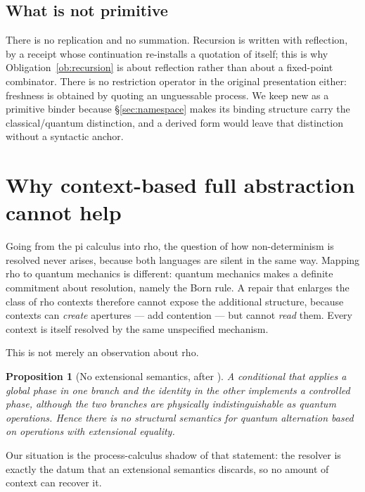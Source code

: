 \documentclass[11pt,a4paper]{article}
\theoremstyle{plain}
\newtheorem{proposition}[theorem]{Proposition}
\theoremstyle{definition}
\theoremstyle{remark}
\begin{document}
\subsection{What is not primitive}

There is no replication and no summation. Recursion is written with reflection,
by a receipt whose continuation re-installs a quotation of itself; this is why
Obligation~\ref{ob:recursion} is about reflection rather than about a fixed-point
combinator. There is no restriction operator in the original presentation
either: freshness is obtained by quoting an unguessable process. We keep
\textsf{new} as a primitive binder because \S\ref{sec:namespace} makes its
binding structure carry the classical/quantum distinction, and a derived form
would leave that distinction without a syntactic anchor.

\section{Why context-based full abstraction cannot help}\label{sec:fa}

Going from the pi calculus into rho, the question of how non-determinism is
resolved never arises, because both languages are silent in the same way.
Mapping rho to quantum mechanics is different: quantum mechanics makes a
definite commitment about resolution, namely the Born rule. A repair that
enlarges the class of rho contexts therefore cannot expose the additional
structure, because contexts can \emph{create} apertures --- add contention ---
but cannot \emph{read} them. Every context is itself resolved by the same
unspecified mechanism.

This is not merely an observation about rho.

\begin{proposition}[No extensional semantics, after
\cite{BadescuPanangaden}]\label{prop:noext}
A conditional that applies a global phase in one branch and the identity in the
other implements a controlled phase, although the two branches are physically
indistinguishable as quantum operations. Hence there is no structural semantics
for quantum alternation based on operations with extensional equality.
\end{proposition}

Our situation is the process-calculus shadow of that statement: the resolver is
exactly the datum that an extensional semantics discards, so no amount of
context can recover it.
\end{document}
